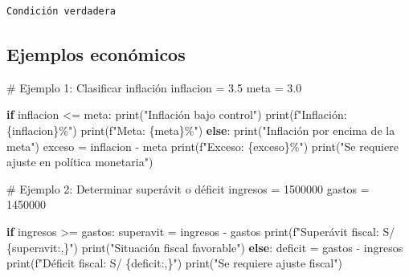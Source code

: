 \documentclass[
  doc,
  floatsintext,
  longtable,
  a4paper,
  nolmodern,
  notxfonts,
  notimes,
  12pt,
  colorlinks=true,linkcolor=blue,citecolor=blue,urlcolor=blue]{apa7}
\newenvironment{Shaded}{\begin{snugshade}}{\end{snugshade}}
\newcommand{\BuiltInTok}[1]{\textcolor[rgb]{0.00,0.23,0.31}{#1}}
\newcommand{\CommentTok}[1]{\textcolor[rgb]{0.37,0.37,0.37}{#1}}
\newcommand{\ControlFlowTok}[1]{\textcolor[rgb]{0.00,0.23,0.31}{\textbf{#1}}}
\newcommand{\DecValTok}[1]{\textcolor[rgb]{0.68,0.00,0.00}{#1}}
\newcommand{\FloatTok}[1]{\textcolor[rgb]{0.68,0.00,0.00}{#1}}
\newcommand{\NormalTok}[1]{\textcolor[rgb]{0.00,0.23,0.31}{#1}}
\newcommand{\OperatorTok}[1]{\textcolor[rgb]{0.37,0.37,0.37}{#1}}
\newcommand{\SpecialCharTok}[1]{\textcolor[rgb]{0.37,0.37,0.37}{#1}}
\newcommand{\SpecialStringTok}[1]{\textcolor[rgb]{0.13,0.47,0.30}{#1}}
\newcommand{\StringTok}[1]{\textcolor[rgb]{0.13,0.47,0.30}{#1}}
\begin{document}
\begin{verbatim}
Condición verdadera
\end{verbatim}

\subsection{Ejemplos económicos}\label{ejemplos-econuxf3micos-1}

\begin{Shaded}
\begin{Highlighting}[]
\CommentTok{\# Ejemplo 1: Clasificar inflación}
\NormalTok{inflacion }\OperatorTok{=} \FloatTok{3.5}
\NormalTok{meta }\OperatorTok{=} \FloatTok{3.0}

\ControlFlowTok{if}\NormalTok{ inflacion }\OperatorTok{\textless{}=}\NormalTok{ meta:}
    \BuiltInTok{print}\NormalTok{(}\StringTok{"Inflación bajo control"}\NormalTok{)}
    \BuiltInTok{print}\NormalTok{(}\SpecialStringTok{f"Inflación: }\SpecialCharTok{\{}\NormalTok{inflacion}\SpecialCharTok{\}}\SpecialStringTok{\%"}\NormalTok{)}
    \BuiltInTok{print}\NormalTok{(}\SpecialStringTok{f"Meta: }\SpecialCharTok{\{}\NormalTok{meta}\SpecialCharTok{\}}\SpecialStringTok{\%"}\NormalTok{)}
\ControlFlowTok{else}\NormalTok{:}
    \BuiltInTok{print}\NormalTok{(}\StringTok{"Inflación por encima de la meta"}\NormalTok{)}
\NormalTok{    exceso }\OperatorTok{=}\NormalTok{ inflacion }\OperatorTok{{-}}\NormalTok{ meta}
    \BuiltInTok{print}\NormalTok{(}\SpecialStringTok{f"Exceso: }\SpecialCharTok{\{}\NormalTok{exceso}\SpecialCharTok{\}}\SpecialStringTok{\%"}\NormalTok{)}
    \BuiltInTok{print}\NormalTok{(}\StringTok{"Se requiere ajuste en política monetaria"}\NormalTok{)}

\CommentTok{\# Ejemplo 2: Determinar superávit o déficit}
\NormalTok{ingresos }\OperatorTok{=} \DecValTok{1500000}
\NormalTok{gastos }\OperatorTok{=} \DecValTok{1450000}

\ControlFlowTok{if}\NormalTok{ ingresos }\OperatorTok{\textgreater{}=}\NormalTok{ gastos:}
\NormalTok{    superavit }\OperatorTok{=}\NormalTok{ ingresos }\OperatorTok{{-}}\NormalTok{ gastos}
    \BuiltInTok{print}\NormalTok{(}\SpecialStringTok{f"Superávit fiscal: S/ }\SpecialCharTok{\{}\NormalTok{superavit}\SpecialCharTok{:,\}}\SpecialStringTok{"}\NormalTok{)}
    \BuiltInTok{print}\NormalTok{(}\StringTok{"Situación fiscal favorable"}\NormalTok{)}
\ControlFlowTok{else}\NormalTok{:}
\NormalTok{    deficit }\OperatorTok{=}\NormalTok{ gastos }\OperatorTok{{-}}\NormalTok{ ingresos}
    \BuiltInTok{print}\NormalTok{(}\SpecialStringTok{f"Déficit fiscal: S/ }\SpecialCharTok{\{}\NormalTok{deficit}\SpecialCharTok{:,\}}\SpecialStringTok{"}\NormalTok{)}
    \BuiltInTok{print}\NormalTok{(}\StringTok{"Se requiere ajuste fiscal"}\NormalTok{)}


\end{Highlighting}
\end{Shaded}
\end{document}

